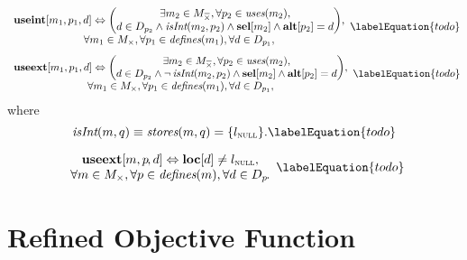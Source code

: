\begin{equation}
  \begin{array}{c}
    \mVar{useint}[m_1, p_1, d]
    \mEq
    \left(
    \begin{array}{@{}c@{}}
      \exists m_2 \in \mKillMatchCompSet,
      \forall p_2 \in \mUses(m_2), \\
      d \in \mDataSet[p_2] \mAnd \mIsInt(m_2, p_2)
      \mAnd
      \mVar{sel}[m_2]
      \mAnd
      \mVar{alt}[p_2] = d
    \end{array}
    \right) \!, \\
    \forall m_1 \in \mKillMatchSet,
    \forall p_1 \in \mDefines(m_1),
    \forall d \in \mDataSet[p_1],
  \end{array}
  \labelEquation{todo}
\end{equation}
%
\begin{equation}
  \begin{array}{c}
    \mVar{useext}[m_1, p_1, d]
    \mEq
    \left(
    \begin{array}{@{}c@{}}
      \exists m_2 \in \mKillMatchCompSet,
      \forall p_2 \in \mUses(m_2), \\
      d \in \mDataSet[p_2] \mAnd \neg\mIsInt(m_2, p_2)
      \mAnd
      \mVar{sel}[m_2]
      \mAnd
      \mVar{alt}[p_2] = d
    \end{array}
    \right) \!, \\
    \forall m_1 \in \mKillMatchSet,
    \forall p_1 \in \mDefines(m_1),
    \forall d \in \mDataSet[p_1],
  \end{array}
  \labelEquation{todo}
\end{equation}
%
where
%
\begin{equation}
  \mIsInt(m, q) \equiv \mStores(m, q) = \mSet{\mNullLocation}.
  \labelEquation{todo}
\end{equation}

\begin{equation}
  \begin{array}{c}
    \mVar{useext}[m, p \hspace{-1pt}, d]
    \mEq
    \mVar{loc}[d] \neq \mNullLocation, \\
    \forall m \in \mKillMatchSet,
    \forall p \in \mDefines(m),
    \forall d \in \mDataSet[p] \hspace{-1pt}.
  \end{array}
  \labelEquation{todo}
\end{equation}


\section{Refined Objective Function}

